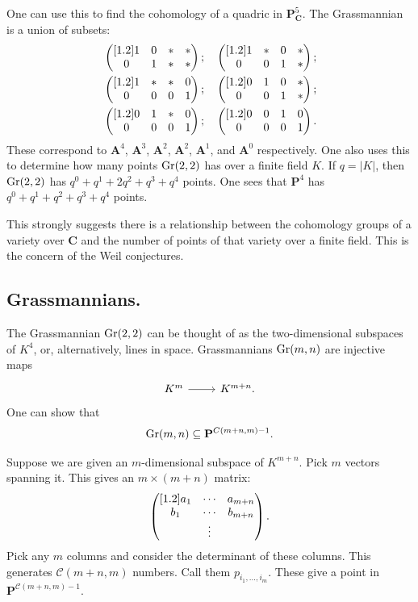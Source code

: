 \documentclass [11 pt, oneside] {article}
\begin{document}
One can use this to find the cohomology of a quadric in $\mathbf{P}^5_{\mathbf{C}}$. The Grassmannian is a union of subsets:
\begin{align*}
	&\begin{pmatrix} [1.2] 1&0&*&*\\0&1&*&*\end{pmatrix};
	\quad\begin{pmatrix} [1.2] 1&*&0&*\\0&0&1&*\end{pmatrix};\\
	&\begin{pmatrix} [1.2] 1&*&*&0\\0&0&0&1\end{pmatrix};
	\quad\begin{pmatrix} [1.2] 0&1&0&*\\0&0&1&*\end{pmatrix};\\
	&\begin{pmatrix} [1.2] 0&1&*&0\\0&0&0&1\end{pmatrix};
	\quad\begin{pmatrix} [1.2] 0&0&1&0\\0&0&0&1\end{pmatrix}.
\end{align*}
These correspond to $\mathbf{A}^4$, $\mathbf{A}^3$, $\mathbf{A}^2$, $\mathbf{A}^2$, $\mathbf{A}^1$, and $\mathbf{A}^0$ respectively. One also uses this to determine how many points $\operatorname{Gr}(2,2)$ has over a finite field $K$. If $q=\left\lvert K \right\rvert $, then $\operatorname{Gr}(2,2)$ has $q^0 + q^1 + 2q^2 + q^3+q^4$ points. One sees that $\mathbf{P}^4$ has $q^0+q^1+q^2+q^3+q^4$ points.

This strongly suggests there is a relationship between the cohomology groups of a variety over $\mathbf{C}$ and the number of points of that variety over a finite field. This is the concern of the Weil conjectures.

\subsection{Grassmannians.}
The Grassmannian $\operatorname{Gr}(2,2)$ can be thought of as the two-dimensional subspaces of $K^4$, or, alternatively, lines in space. Grassmannians $\operatorname{Gr}(m,n)$ are injective maps
\[
\begin{tikzcd}
K^m \ar[r]& K^{m+n}.
\end{tikzcd}
\]
One can show that
\begin{align*}
	\operatorname{Gr}(m,n) \subseteq  \mathbf{P}^{\relax{C}({m+n},{m})-1}.
\end{align*}

Suppose we are given an $m$-dimensional subspace of $K^{m+n}$. Pick $m$ vectors spanning it. This gives an $m\times(m+n)$ matrix:
\begin{align*}
	\begin{pmatrix} [1.2] a_1&\cdots &a_{m+n}\\b_1&\cdots &b_{m+n}\\&\vdots\end{pmatrix}.
\end{align*}
Pick any $m$ columns and consider the determinant of these columns. This generates $\mathscr{C}({m+n},{m})$ numbers. Call them $p_{{i_1},\hdots,{i_m}}$. These give a point in $\mathbf{P}^{\mathscr{C}({m+n},{m}) - 1}$. 
\end{document}
